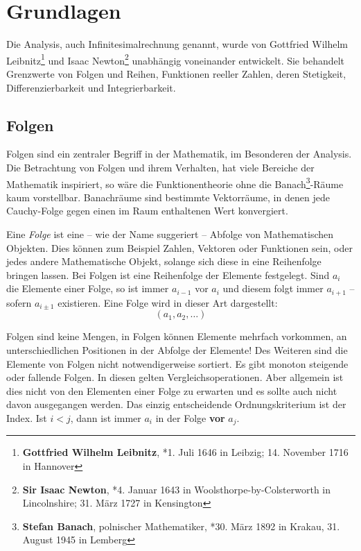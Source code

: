 
\chapter{Grundlagen}

Die Analysis, auch Infinitesimalrechnung genannt, wurde von Gottfried Wilhelm Leibnitz\footnote{\textbf{Gottfried Wilhelm Leibnitz}, *1. Juli 1646 in Leibzig; 14. November 1716 in Hannover} und Isaac Newton\footnote{\textbf{Sir Isaac Newton}, *4. Januar 1643 in Woolsthorpe-by-Colsterworth in Lincolnshire; 31. März 1727 in Kensington} unabhängig voneinander entwickelt. Sie behandelt Grenzwerte von Folgen und Reihen, Funktionen reeller Zahlen, deren Stetigkeit, Differenzierbarkeit und Integrierbarkeit. 

\section{Folgen}

Folgen sind ein zentraler Begriff in der Mathematik, im Besonderen der Analysis. Die Betrachtung von Folgen und ihrem Verhalten, hat viele Bereiche der Mathematik inspiriert, so wäre die Funktionentheorie ohne die Banach\footnote{\textbf{Stefan Banach}, polnischer Mathematiker,  *30. März 1892 in Krakau, 31. August 1945 in Lemberg}-Räume kaum vorstellbar.  Banachräume sind bestimmte Vektorräume, in denen jede Cauchy-Folge gegen einen im Raum enthaltenen Wert konvergiert.

\begin{definition}
Eine \textsl{Folge} ist eine -- wie der Name suggeriert -- Abfolge von Mathematischen Objekten. Dies können zum Beispiel Zahlen, Vektoren oder Funktionen sein, oder jedes andere Mathematische Objekt, solange sich diese in eine Reihenfolge bringen lassen. Bei Folgen ist eine Reihenfolge der Elemente festgelegt. Sind $a_i$ die Elemente einer Folge, so ist immer $a_{i-1}$ vor $a_i$ und diesem folgt immer $a_{i+1}$ -- sofern $a_{i\pm 1}$ existieren. Eine Folge wird in dieser Art dargestellt:
\[
(a_1, a_2, \dots)
\]
\end{definition}

Folgen sind keine Mengen, in Folgen können Elemente mehrfach vorkommen, an unterschiedlichen Positionen in der Abfolge der Elemente! Des Weiteren sind die Elemente von Folgen nicht notwendigerweise sortiert. Es gibt monoton steigende oder fallende Folgen. In diesen gelten Vergleichsoperationen. Aber allgemein ist dies nicht von den Elementen einer Folge zu erwarten und es sollte auch nicht davon ausgegangen werden. Das einzig entscheidende Ordnungskriterium ist der Index. Ist $i<j$, dann ist immer $a_i$ in der Folge \textbf{vor} $a_j$.

